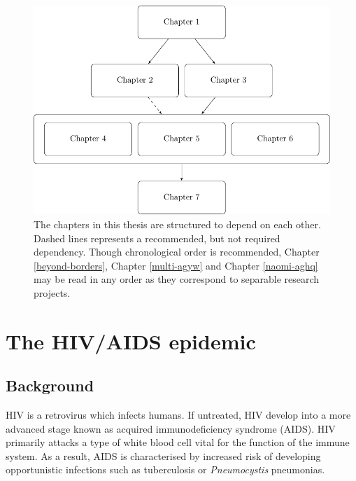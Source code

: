 \documentclass[a4paper, nobind]{templates/ociamthesis}
\begin{document}
\begin{figure}

{\centering \includegraphics[width=0.95\linewidth]{figures/introduction/chapter-flowchart} 

}

\caption{The chapters in this thesis are structured to depend on each other. Dashed lines represents a recommended, but not required dependency. Though chronological order is recommended, Chapter \ref{beyond-borders}, Chapter \ref{multi-agyw} and Chapter \ref{naomi-aghq} may be read in any order as they correspond to separable research projects.}\label{fig:chapter-flowchart}
\end{figure}

\hypertarget{hiv-aids}{%
\chapter{The HIV/AIDS epidemic}\label{hiv-aids}}

\adjustmtc
{}

\hypertarget{background}{%
\section{Background}\label{background}}

HIV is a retrovirus which infects humans.
If untreated, HIV develop into a more advanced stage known as acquired immunodeficiency syndrome (AIDS).
HIV primarily attacks a type of white blood cell vital for the function of the immune system.
As a result, AIDS is characterised by increased risk of developing opportunistic infections such as tuberculosis or \emph{Pneumocystis} pneumonias.
\end{document}
